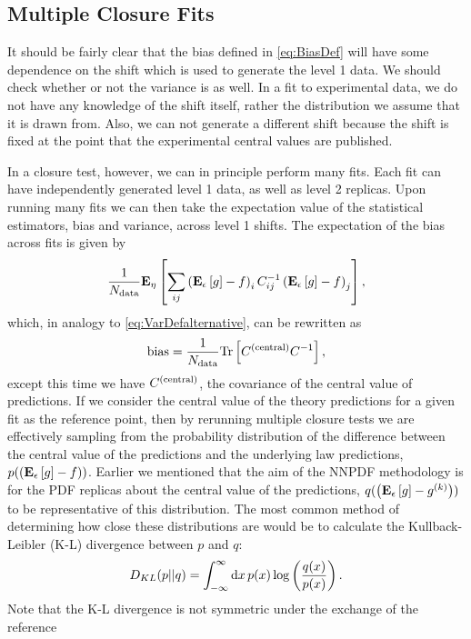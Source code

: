 \subsection{Multiple Closure Fits}

It should be fairly clear that the bias defined in \eqref{eq:BiasDef} will have
some dependence on the shift which is used to generate the level 1 data. We should
check whether or not the variance is as well. In a fit to experimental
data, we do not have any knowledge of the shift itself, rather the distribution
we assume that it is drawn from. Also, we can not generate a different shift
because the shift is fixed at the point that the experimental central values
are published.

In a closure test, however, we can in principle perform many
fits. Each fit can have independently generated level 1 data, as well as
level 2 replicas. Upon running many fits we can then take the expectation value
of the statistical estimators, bias and variance, across level 1 shifts. The expectation
of the bias across fits is given by
\begin{equation}
    \frac{1}{N_{\rm data}} \mathbf{E}_{\eta}\left[  \sum_{ij} \left( \mathbf{E}_{\epsilon}\left[ g \right] - f \right)_i C^{-1}_{ij} \left( \mathbf{E}_{\epsilon}\left[ g \right] - f \right)_j  \right],
\end{equation}
which, in analogy to \eqref{eq:VarDefalternative}, can be rewritten as
\begin{equation}
    \label{eq:BiasDefalternative}
    {\rm bias} = \frac{1}{N_{\rm data}} {\rm Tr} \left[ C^{(\rm central)} C^{-1}_{} \right],
\end{equation}
except this time we have $C^{(\rm central)}$, the covariance of the central value
of predictions. If we consider the central value of the theory predictions for
a given fit as the reference point, then by rerunning multiple closure tests
we are effectively sampling from the probability distribution of the
difference between the central value of the predictions and the underlying law
predictions, $p(\left( \mathbf{E}_{\epsilon}\left[ g \right] - f \right))$. Earlier we mentioned that the aim of the NNPDF
methodology is for the PDF replicas about the central value of the predictions,
$q(\left( \mathbf{E}_{\epsilon}\left[ g \right] - g^{(k)}\right))$ to be representative of this distribution. The most common
method of determining how close these distributions are would be to calculate
the Kullback-Leibler (K-L) divergence between $p$ and $q$:
\begin{equation}
    D_{KL}(p || q) = \int_{-\infty}^{\infty} {\rm d} x \, p(x) \log \left(\frac{q(x)}{p(x)} \right).
\end{equation}
Note that the K-L divergence is not symmetric under the exchange of the reference

